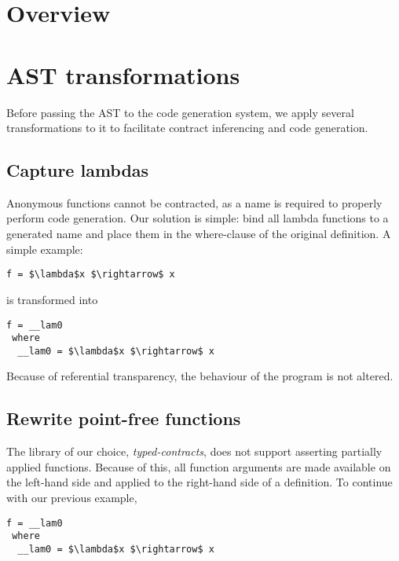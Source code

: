 \documentclass[10pt]{report}
\begin{document}
\section{Overview}




\section{AST transformations}
Before passing the AST to the code generation system, we apply several transformations to it to facilitate contract inferencing and code generation.

\subsection{Capture lambdas}
Anonymous functions cannot be contracted, as a name is required to properly  perform code generation.
Our solution is simple: bind all lambda functions to a generated name and place them in the where-clause of the original definition.
A simple example:

\begin{lstlisting}[mathescape]
f = $\lambda$x $\rightarrow$ x
\end{lstlisting}

is transformed into

\begin{lstlisting}[mathescape,caption=Result of lambda capture transformation.]
f = __lam0                   
 where                    
  __lam0 = $\lambda$x $\rightarrow$ x
\end{lstlisting}

Because of referential transparency, the behaviour of the program is not altered.

\subsection{Rewrite point-free functions}
The library of our choice, \textit{typed-contracts}, does not support asserting partially applied functions.
Because of this, all function arguments are made available on the left-hand side and applied to the right-hand side of a definition.
To continue with our previous example,

\begin{lstlisting}[mathescape]
f = __lam0                   
 where                    
  __lam0 = $\lambda$x $\rightarrow$ x
\end{lstlisting}
\end{document}
